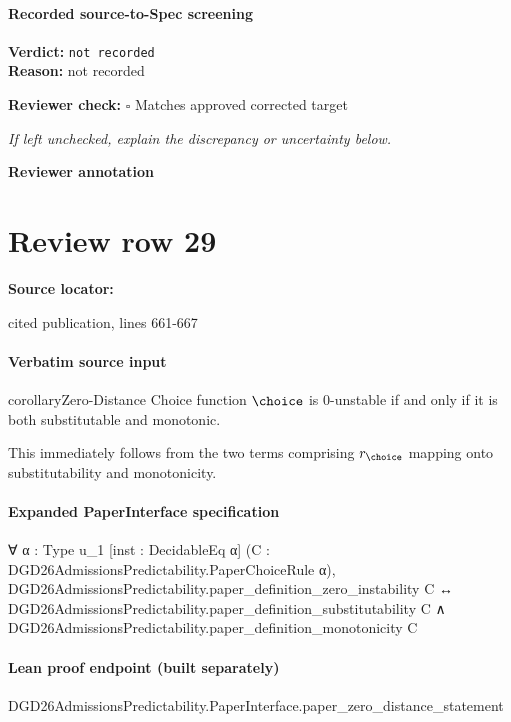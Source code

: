 \documentclass[10pt]{article}
\newcommand{\reviewerbox}{%
  \par\noindent\fbox{\parbox{0.96\linewidth}{\rule{0pt}{0.38in}}}\par
}
\newcommand{\reviewmatch}[1]{%
  \par\noindent\textbf{Reviewer check:} $\square$\; #1\par
  \noindent\emph{If left unchecked, explain the discrepancy or uncertainty below.}\par
}
\begin{document}
\paragraph{Recorded source-to-Spec screening}
\textbf{Verdict:} \texttt{not recorded}
\\
\textbf{Reason:} not recorded
\reviewmatch{Matches approved corrected target}
\noindent\textbf{Reviewer annotation}\par
\reviewerbox
\clearpage
\hypertarget{source-claim-1daa198b9d0a1bc3}{}
\section*{Review row 29}
\textbf{Source locator:} {\footnotesize\raggedright cited publication, lines 661-\allowbreak{}667\par}
\paragraph{Verbatim source input}
\begin{ReviewVerbatim}
\begin{restatable}{corollary}{Zero-Distance}
\label{thm:sub-mon-zero}
Choice function $\choice$ is 0-unstable if and only if it is both substitutable and monotonic.
\end{restatable}


This immediately follows from the two terms comprising $r_\choice$ mapping onto substitutability and monotonicity.
\end{ReviewVerbatim}


\paragraph{Expanded PaperInterface specification}
\begin{ReviewVerbatim}
∀ {α : Type u_1} [inst : DecidableEq α] (C : DGD26AdmissionsPredictability.PaperChoiceRule α),
  DGD26AdmissionsPredictability.paper_definition_zero_instability C ↔
    DGD26AdmissionsPredictability.paper_definition_substitutability C ∧
      DGD26AdmissionsPredictability.paper_definition_monotonicity C
\end{ReviewVerbatim}

\paragraph{Lean proof endpoint (built separately)}\begin{ReviewVerbatim}
DGD26AdmissionsPredictability.PaperInterface.paper_zero_distance_statement
\end{ReviewVerbatim}
\end{document}
